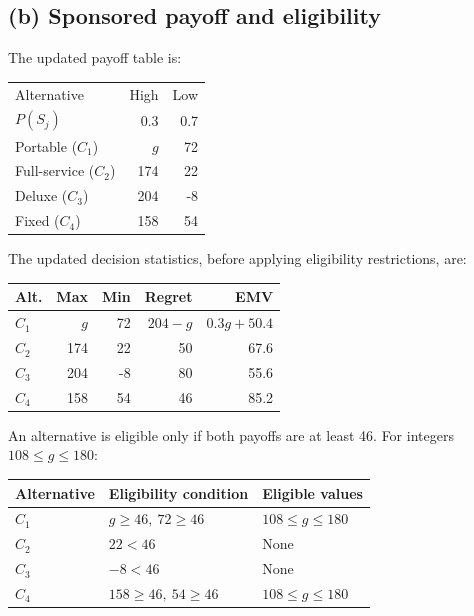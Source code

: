 \label{sol:q2b}
\subsection*{(b) Sponsored payoff and eligibility }

The updated payoff table is:

\begin{center}\small\setlength{\tabcolsep}{4pt}
	\begin{tabular}{lrr}\toprule
		Alternative & High & Low\\
		$P(S_j)$ & 0.3 & 0.7\\ \midrule
				Portable ($C_1$) & $g$ & 72\\
		Full-service ($C_2$) & 174 & 22\\
		Deluxe ($C_3$) & 204 & -8\\
		Fixed ($C_4$) & 158 & 54\\
		\bottomrule
	\end{tabular}
\end{center}

The updated decision statistics, before applying
eligibility restrictions, are:

\begin{center}\small\setlength{\tabcolsep}{4pt}
	\begin{tabular}{lrrrr}\toprule
		Alt. & Max & Min & Regret & EMV\\ \midrule
				$C_1$ & $g$ & 72 & $204-g$ & $0.3g+50.4$\\
		$C_2$ & 174 & 22 & 50 & 67.6\\
		$C_3$ & 204 & -8 & 80 & 55.6\\
		$C_4$ & 158 & 54 & 46 & 85.2\\
		\bottomrule
	\end{tabular}
\end{center}

An alternative is eligible only if both payoffs
are at least 46. For integers $108\le g\le180$:

\begin{center}
\begin{tabular}{lll}\toprule
Alternative & Eligibility condition & Eligible values\\\midrule
$C_1$ & $g\ge46,\ 72\ge46$ & $108\le g\le180$\\
$C_2$ & $22<46$ & None\\
$C_3$ & $-8<46$ & None\\
$C_4$ & $158\ge46,\ 54\ge46$ & $108\le g\le180$\\
\bottomrule
\end{tabular}
\end{center}

